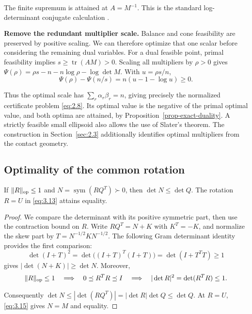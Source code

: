 The finite supremum is attained at $A=M^{-1}$. This is the standard log-determinant conjugate calculation \cite[Chapters 3 and 5]{BV2004}.

\textbf{Remove the redundant multiplier scale.} Balance and cone feasibility
are preserved by positive scaling. We can therefore optimize that one scalar
before considering the remaining dual variables. For a dual feasible point,
primal feasibility implies $s\ge\operatorname{tr}(AM)>0$.
Scaling all multipliers by $\rho>0$ gives
$\Psi(\rho)=\rho s-n-n\log\rho-\log\det M$. With $u=\rho s/n$,
\begin{equation}\label{eq:10.3}
\Psi(\rho)-\Psi(n/s)=n(u-1-\log u)\ge0.
\end{equation}

Thus the optimal scale has $\sum_r\alpha_r\beta_r=n$, giving precisely
the normalized certificate problem \eqref{eq:2.8}. Its optimal value is the negative
of the primal optimal value, and both optima are attained, by Proposition~\ref{prop-exact-duality}.
A strictly feasible small ellipsoid also allows the use of Slater's theorem.
The construction in Section~\ref{sec:2.3} additionally identifies optimal multipliers
from the contact geometry.

\subsection{Optimality of the common rotation}\label{sec:10.2}

\begin{proposition}\label{prop-polar}
If $\|R\|_{\rm op}\le1$ and $N=\operatorname{sym}(RQ^T)\succ0$, then $\det N\le\det Q$. The rotation $R=U$ in \eqref{eq:3.13} attains equality.

\end{proposition}

\begin{proof}
We compare the determinant with its positive symmetric part,
then use the contraction bound on $R$. Write $RQ^T=N+K$ with $K^T=-K$,
and normalize the skew part by $T=N^{-1/2}KN^{-1/2}$.
The following Gram determinant identity provides the first comparison:
\begin{equation}\label{eq:10.4}
\det(I+T)^2=\det\bigl((I+T)^T(I+T)\bigr)
=\det(I+T^TT)\ge1
\end{equation}
gives $|\det(N+K)|\ge\det N$. Moreover,
\begin{equation}\label{eq:10.5}
\|R\|_{\rm op}\le1
\quad\Longrightarrow\quad 0\preceq R^TR\preceq I
\quad\Longrightarrow\quad |\det R|^2=\det(R^TR)\le1.
\end{equation}

Consequently $\det N\le|\det(RQ^T)|=|\det R|\det Q\le\det Q$.
At $R=U$, \eqref{eq:3.15} gives $N=M$ and equality. 
\end{proof}

